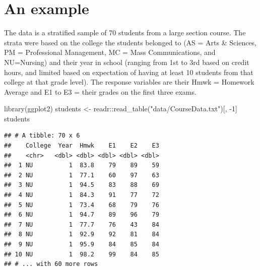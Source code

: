 \documentclass[
]{book}
\newenvironment{Shaded}{\begin{snugshade}}{\end{snugshade}}
\newcommand{\DecValTok}[1]{\textcolor[rgb]{0.00,0.00,0.81}{#1}}
\newcommand{\FunctionTok}[1]{\textcolor[rgb]{0.00,0.00,0.00}{#1}}
\newcommand{\NormalTok}[1]{#1}
\newcommand{\OtherTok}[1]{\textcolor[rgb]{0.56,0.35,0.01}{#1}}
\newcommand{\SpecialCharTok}[1]{\textcolor[rgb]{0.00,0.00,0.00}{#1}}
\newcommand{\StringTok}[1]{\textcolor[rgb]{0.31,0.60,0.02}{#1}}
\begin{document}
\hypertarget{an-example}{%
\section{An example}\label{an-example}}

The data is a stratified sample of 70 students from a large section course. The strata were based on the college the students belonged to (AS = Arts \& Sciences, PM = Professional Management, MC = Mass Communications, and NU=Nursing) and their year in school (ranging from 1st to 3rd based on credit hours, and limited based on expectation of having at least 10 students from that college at that grade level). The response variables are their Hmwk = Homework Average and E1 to E3 = their grades on the first three exams.

\begin{Shaded}
\begin{Highlighting}[]
\FunctionTok{library}\NormalTok{(ggplot2)}
\NormalTok{students }\OtherTok{\textless{}{-}}\NormalTok{ readr}\SpecialCharTok{::}\FunctionTok{read\_table}\NormalTok{(}\StringTok{"data/CourseData.txt"}\NormalTok{)[, }\SpecialCharTok{{-}}\DecValTok{1}\NormalTok{]}
\NormalTok{students}
\end{Highlighting}
\end{Shaded}

\begin{verbatim}
## # A tibble: 70 x 6
##    College  Year  Hmwk    E1    E2    E3
##    <chr>   <dbl> <dbl> <dbl> <dbl> <dbl>
##  1 NU          1  83.8    79    89    59
##  2 NU          1  77.1    60    97    63
##  3 NU          1  94.5    83    88    69
##  4 NU          1  84.3    91    77    72
##  5 NU          1  73.4    68    79    76
##  6 NU          1  94.7    89    96    79
##  7 NU          1  77.7    76    43    84
##  8 NU          1  92.9    92    81    84
##  9 NU          1  95.9    84    85    84
## 10 NU          1  98.2    99    84    85
## # ... with 60 more rows
\end{verbatim}
\end{document}
